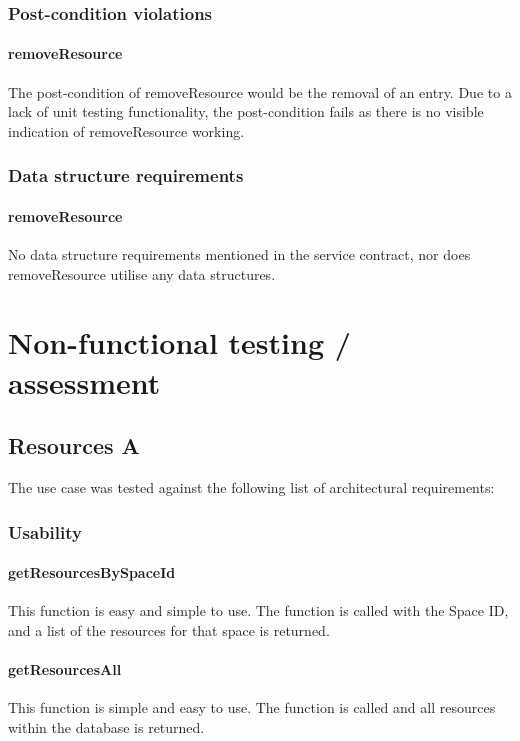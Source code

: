 \documentclass[a4paper]{article}
\begin{document}
\subsubsection {Post-condition violations}

\paragraph{removeResource}
The post-condition of removeResource would be the removal of an entry. Due to a lack of unit testing functionality, the post-condition fails as there is no visible indication of removeResource working.

\subsubsection {Data structure requirements}

\paragraph{removeResource}
No data structure requirements mentioned in the service contract, nor does removeResource utilise any data structures.

\section {Non-functional testing / assessment}
\subsection {Resources A}
The use case was tested against the following list of architectural requirements:
\subsubsection {Usability}
\paragraph{getResourcesBySpaceId}
This function is easy and simple to use. The function is called with the Space ID, and a list of the resources for that space is returned.

\paragraph{getResourcesAll}
This function is simple and easy to use. The function is called and all resources within the database is returned.
\end{document}
